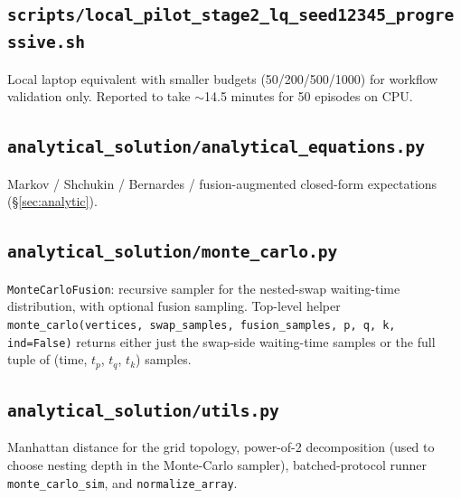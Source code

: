 \documentclass[11pt]{article}
\newcommand{\code}[1]{\texttt{#1}}
\newcommand{\file}[1]{\texttt{\small #1}}
\begin{document}
\subsection{\file{scripts/local\_pilot\_stage2\_lq\_seed12345\_progressive.sh}}
Local laptop equivalent with smaller budgets (50/200/500/1000) for workflow validation only. Reported to take $\sim$14.5 minutes for 50 episodes on CPU.

\subsection{\file{analytical\_solution/analytical\_equations.py}}
Markov / Shchukin / Bernardes / fusion-augmented closed-form expectations (\S\ref{sec:analytic}).

\subsection{\file{analytical\_solution/monte\_carlo.py}}
\code{MonteCarloFusion}: recursive sampler for the nested-swap waiting-time distribution, with optional fusion sampling. Top-level helper \code{monte\_carlo(vertices, swap\_samples, fusion\_samples, p, q, k, ind=False)} returns either just the swap-side waiting-time samples or the full tuple of (time, $t_p$, $t_q$, $t_k$) samples.

\subsection{\file{analytical\_solution/utils.py}}
Manhattan distance for the grid topology, power-of-2 decomposition (used to choose nesting depth in the Monte-Carlo sampler), batched-protocol runner \code{monte\_carlo\_sim}, and \code{normalize\_array}.
\end{document}
